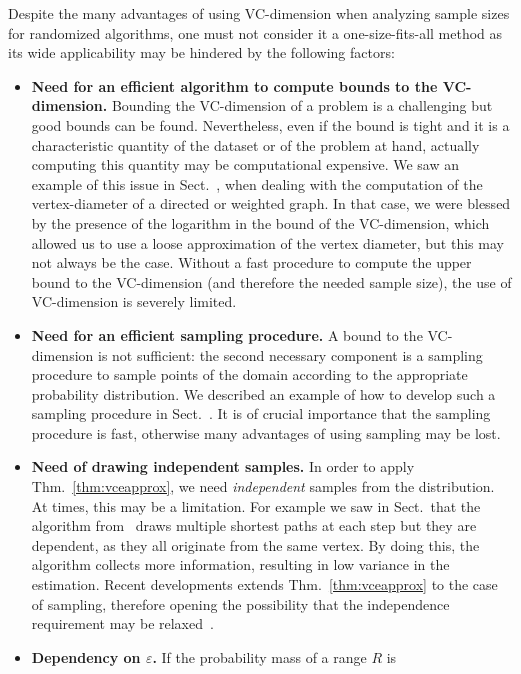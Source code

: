 Despite the many advantages of using VC-dimension when analyzing sample sizes
for randomized algorithms, one must not consider it a one-size-fits-all method
as its wide applicability may be hindered by the following factors:
\begin{itemize}
  \item{\bf Need for an efficient algorithm to compute bounds to the
    VC-dimension.} Bounding the VC-dimension of a problem is a challenging but
    good bounds can be found. Nevertheless, even if the bound is tight and it is a
    characteristic quantity of the dataset or of the problem at hand, actually
    computing this quantity may be computational expensive. We saw an example of
    this issue in Sect.~, when dealing with the computation of the
    vertex-diameter of a directed or weighted graph. In that case, we were
    blessed by the presence of the logarithm in the bound of the VC-dimension,
    which allowed us to use a loose approximation of the vertex diameter, but
    this may not always be the case. Without a fast procedure to compute the
    upper bound to the VC-dimension (and therefore the needed sample size), the
    use of VC-dimension is severely limited.
  \item{\bf Need for an efficient sampling procedure.} A bound to the
    VC-dimension is not sufficient: the second necessary component is a sampling
    procedure to sample points of the domain according to the appropriate
    probability distribution. We described an example of how to develop such a
    sampling procedure in Sect.~. It is of crucial importance that
    the sampling procedure is fast, otherwise many advantages of using sampling
    may be lost.
  \item{\bf Need of drawing independent samples.} In order to apply
    Thm.~\ref{thm:vceapprox}, we need \emph{independent} samples from the
    distribution. At times, this may be a limitation. For example we saw in
    Sect.~ that the algorithm from~\citep{BrandesP08} draws multiple
    shortest paths at each step but they are dependent, as they all originate
    from the same vertex. By doing this, the algorithm collects more
    information, resulting in low variance in the estimation. Recent
    developments extends Thm.~\ref{thm:vceapprox} to the case of
    sampling, therefore opening the possibility that the independence
    requirement may be relaxed~\citemissing.
  \item{\bf Dependency on $\varepsilon$.} If the probability mass of a range $R$ is

\end{itemize}
